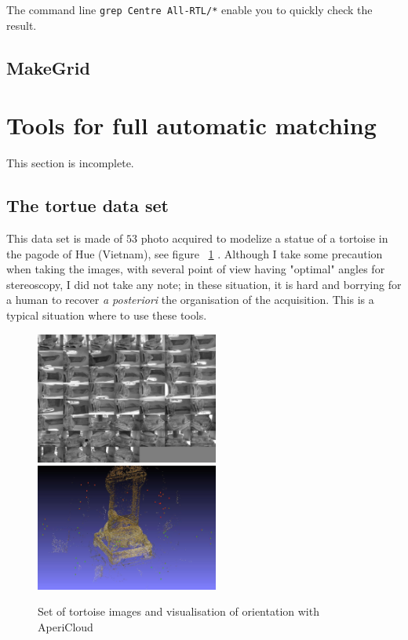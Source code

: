 The command line {\tt grep Centre All-RTL/*} enable you to quickly check the result.


\subsection{MakeGrid}
\label{MAKEGRID}





\section{Tools for full automatic  matching}

This section is incomplete.

\label{FullAutoMatch}

\subsection{The tortue data set}

This data set is made  of $53$ photo acquired to modelize a statue of a tortoise in the
pagode of Hue (Vietnam), see figure ~\ref{FIG:Tortue:Input} . Although I take some precaution when taking the images,
with several point of view having "optimal" angles for stereoscopy, I did not take any
note; in these situation,  it is hard and borrying for a human to recover \emph{a posteriori} the organisation
of the acquisition. This is a typical situation where to use these tools.


\begin{figure}
\begin{center}
\includegraphics[width=60mm]{FIGS/Tortue/AllTortues.jpg}
\includegraphics[width=60mm]{FIGS/Tortue/AP-snapshot00.jpg}
\end{center}
\caption{Set of tortoise images and visualisation of orientation with AperiCloud}
\label{FIG:Tortue:Input}
\end{figure}




